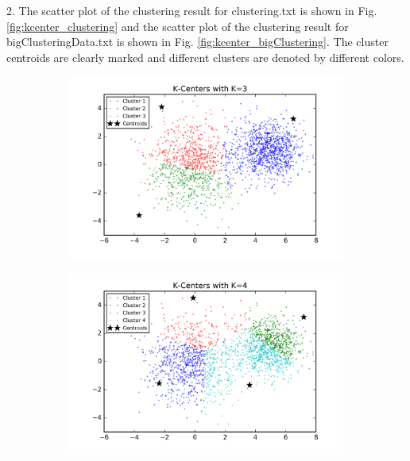 \begin{description}
\begin{description}
\item{2.} The scatter plot of the clustering result for clustering.txt is shown in Fig. \ref{fig:kcenter_clustering} and the scatter plot of the clustering result for bigClusteringData.txt is shown in Fig. \ref{fig:kcenter_bigClustering}. The cluster centroids are clearly marked and different clusters are denoted by different colors. 

\begin{figure}[!h]
        \centering
        \begin{subfigure}[b]{0.475\textwidth}
            \centering
            \includegraphics[width=\textwidth]{./figures/clustering_kCenter_3.png}
        \end{subfigure}
        \hfill
        \begin{subfigure}[b]{0.475\textwidth}  
            \centering 
            \includegraphics[width=\textwidth]{./figures/clustering_kCenter_4.png}

\end{subfigure}
\end{figure}
\end{description}
\end{description}
